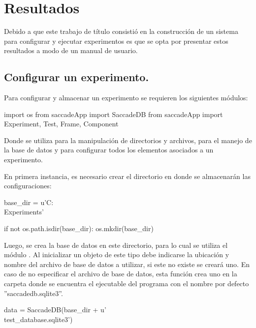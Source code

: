 \documentclass[\main/main.tex]{subfiles}
\begin{document}
\chapter{Resultados}
\label{cha:04_resultados}
    Debido a que este trabajo de título consistió en la construcción de un sistema para configurar y ejecutar experimentos es que se opta por presentar estos resultados a modo de un manual de usuario.

    \section{Configurar un experimento.}
    \label{sec:04_configurar}
        Para configurar y almacenar un experimento se requieren los siguientes módulos:

\begin{singlespace}\begin{python}
import os
from saccadeApp import SaccadeDB
from saccadeApp import Experiment, Test, Frame, Component
\end{python}\end{singlespace}
    
        Donde  se utiliza para la manipulación de directorios y archivos,  para el manejo de la base de datos y  para configurar todos los elementos asociados a un experimento.

        En primera instancia, es necesario crear el directorio en donde se almacenarán las configuraciones:

\begin{singlespace}\begin{python}
base_dir = u'C:\\Experiments'

if not os.path.isdir(base_dir):
    os.mkdir(base_dir) 
\end{python}\end{singlespace}
        
        Luego, se crea la base de datos en este directorio, para lo cual se utiliza el módulo . Al inicializar un objeto de este tipo debe indicarse la ubicación y nombre del archivo de base de datos a utilizar, si este no existe se creará uno. En caso de no especificar el archivo de base de datos, esta función crea uno en la carpeta donde se encuentra el ejecutable del programa con el nombre por defecto ''saccadedb.sqlite3''.   

\begin{singlespace}\begin{python}
data = SaccadeDB(base_dir + u'\\test_database.sqlite3')
\end{python}\end{singlespace}
\end{document}
